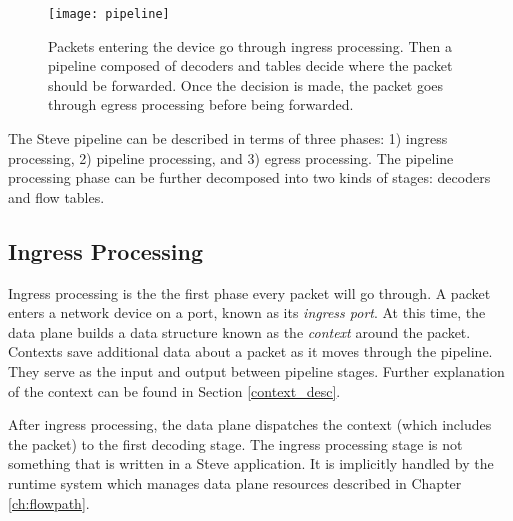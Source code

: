 

\begin{figure} [ht] 
\texttt{[image: pipeline]}
\caption{Packets entering the device go through ingress processing.
Then a pipeline composed of decoders and tables decide where the packet
should be forwarded. Once the decision is made, the packet goes through
egress processing before being forwarded.} 
\label{fg:pipeline_model} 
\end{figure}

The Steve pipeline can be described in terms of three phases: 
1) ingress processing, 2) pipeline processing, and 3) egress processing. 
The pipeline processing phase can be further decomposed into two kinds
of stages: decoders and flow tables.



\subsection{Ingress Processing} \label{ingress_desc}

Ingress processing is the the first phase every packet will go through.
A packet enters a network device on a port, known as its \emph{ingress port}.
At this time, the data plane builds a data structure known as the
\emph{context} around the packet. 
Contexts save additional data about a packet as it moves through the pipeline.
They serve as the input and output between pipeline stages.
Further explanation of the context can be found in Section \ref{context_desc}.

After ingress processing, the data plane dispatches the context (which includes
the packet) to the first decoding stage. The ingress processing stage is not
something that is written in a Steve application. It is implicitly handled by
the runtime system which manages data plane resources described in Chapter
\ref{ch:flowpath}.

